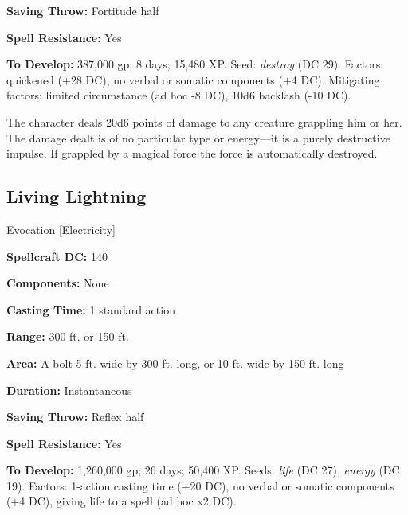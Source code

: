 \documentclass{article}
\begin{document}
\textbf{Saving Throw:} Fortitude half 

\textbf{Spell Resistance:} Yes 

\textbf{To Develop:} 387,000 gp; 8 days; 15,480 XP. Seed: \textit{destroy }(DC 
29). Factors: quickened (+28 DC), no verbal or somatic components (+4 DC). Mitigating 
factors: limited circumstance (ad hoc -8 DC), 10d6 backlash (-10 DC). 

The character deals 20d6 points of damage to any creature grappling him or her. 
The damage dealt is of no particular type or energy---it is a purely destructive 
impulse. If grappled by a magical force the force is automatically destroyed.

\vspace{12pt}
\subsection*{Living Lightning }

Evocation [Electricity] 

\textbf{Spellcraft DC:} 140 

\textbf{Components:} None 

\textbf{Casting Time:} 1 standard action 

\textbf{Range:} 300 ft. or 150 ft. 

\textbf{Area:} A bolt 5 ft. wide by 300 ft. long, or 10 ft. wide by 150 ft. long 

\textbf{Duration:} Instantaneous 

\textbf{Saving Throw:} Reflex half 

\textbf{Spell Resistance:} Yes 

\textbf{To Develop:} 1,260,000 gp; 26 days; 50,400 XP. Seeds: \textit{life }(DC 
27), \textit{energy }(DC 19). Factors: 1-action casting time (+20 DC), no verbal 
or somatic components (+4 DC), giving life to a spell (ad hoc x2 DC). 
\end{document}
